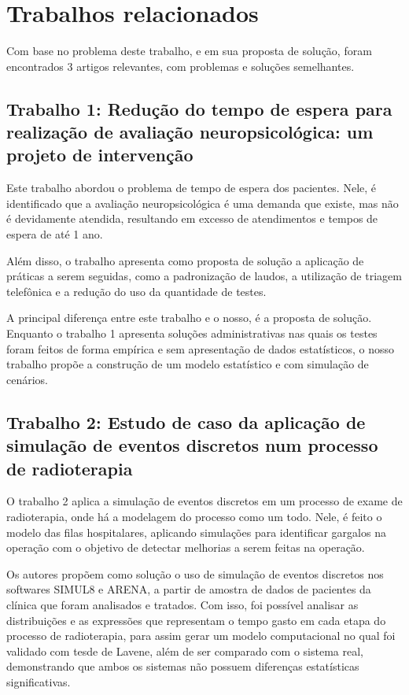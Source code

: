 \documentclass[
    12pt,                %
    openright,           %
    oneside,             %
    a4paper,             %
    english,             %
    brazil               %
]{abntex2}
\begin{document}
\section{Trabalhos relacionados}
\label{sec:trabalhos_relacionados}

Com base no problema deste trabalho, e em sua proposta de solução, foram encontrados 3 artigos relevantes, com problemas e soluções semelhantes. 

\subsection{Trabalho 1: Redução do tempo de espera para realização de avaliação neuropsicológica: um projeto de intervenção \cite{Silva2023}}

Este trabalho abordou o problema de tempo de espera dos pacientes. Nele, é identificado que a avaliação neuropsicológica é uma demanda que existe, mas não é devidamente atendida, resultando em excesso de atendimentos e tempos de espera de até 1 ano.

Além disso, o trabalho apresenta como proposta de solução a aplicação de práticas a serem seguidas, como a padronização de laudos, a utilização de triagem telefônica e a redução do uso da quantidade de testes.

A principal diferença entre este trabalho e o nosso, é a proposta de solução. Enquanto o trabalho 1 apresenta soluções administrativas nas quais os testes foram feitos de forma empírica e sem apresentação de dados estatísticos, o nosso trabalho propõe a construção de um modelo estatístico e com simulação de cenários.

\subsection{Trabalho 2: Estudo de caso da aplicação de simulação de eventos discretos num processo de radioterapia \cite{Galves2022}}

O trabalho 2 aplica a simulação de eventos discretos em um processo de exame de radioterapia, onde há a modelagem do processo como um todo. Nele, é feito o modelo das filas hospitalares, aplicando simulações para identificar gargalos na operação com o objetivo de detectar melhorias a serem feitas na operação.

Os autores propõem como solução o uso de simulação de eventos discretos nos softwares SIMUL8 e ARENA, a partir de amostra de dados de pacientes da clínica que foram analisados e tratados. Com isso, foi possível analisar as distribuições e as expressões que representam o tempo gasto em cada etapa do processo de radioterapia, para assim gerar um modelo computacional no qual foi validado com tesde de Lavene, além de ser comparado com o sistema real, demonstrando que ambos os sistemas não possuem diferenças estatísticas significativas.
\end{document}
